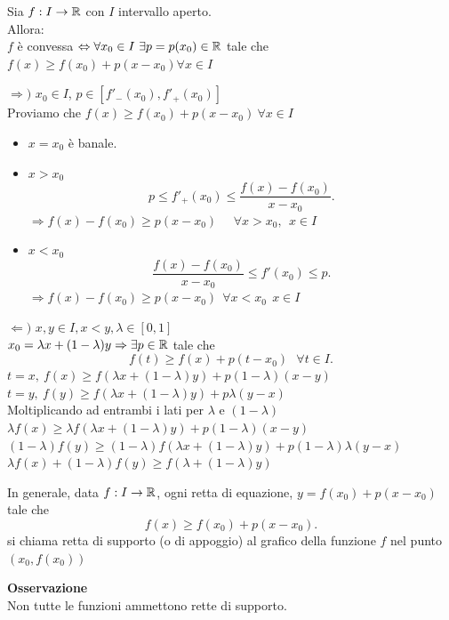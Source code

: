 \documentclass[12px]{article}
\begin{document}
	\begin{teo}
		Sia  $f:I \rightarrow \mathbb{R}$ con $I$ intervallo aperto.\\
		Allora:\\
		$f$ è convessa $ \Leftrightarrow \forall x_0\in I\ \exists p = p(x_0)\in \R$ tale che $f(x)\geq f(x_0) + p(x-x_0)\forall x\in I$
	\end{teo}
	\begin{dimo}
		$ \Rightarrow )$ $x_0\in I$, $p\in[f'_-(x_0),f'_+(x_0)]$\\
		Proviamo che $f(x) \geq f(x_0) + p(x-x_0)\ \forall x\in I$
		\begin{itemize}
			\item $x = x_0$ è banale.
			\item $x > x_0$
				\[
					p\leq f'_+(x_0) \leq\frac{f(x)-f(x_0)}{x-x_0}
				.\] 
				$ \Rightarrow  f(x) - f(x_0) \geq p(x-x_0)$ \ \ $\forall x> x_0,\ \ x\in I$
			\item $x < x_0$
				\[
					\frac{f(x)-f(x_0)}{x-x_0}\leq f'(x_0) \leq p
				.\] 
				 $\Rightarrow  f(x)-f(x_0)\geq p(x-x_0)\ \ \forall x< x_0\ \ x\in I$
		\end{itemize}
		$ \Leftarrow ) $ $x,y\in I, x < y, \lambda\in[0,1]$\\
		$x_0 = \lambda x + (1- \lambda)y \Rightarrow \exists p\in \mathbb{R}$ tale che 
		\[
		f(t)\geq f(x) + p(t-x_0) \ \ \ \forall t\in I
		.\] 
		$t = x, \ f(x)\geq f( \lambda x + (1- \lambda)y) + p (1- \lambda)(x-y)$ \\
		$t = y, \ f(y)\geq f( \lambda x + (1- \lambda)y) + p \lambda(y-x)$ \\
		Moltiplicando ad entrambi i lati per $ \lambda$ e $(1- \lambda)$
		$ \lambda f(x)\geq \lambda f( \lambda x + (1- \lambda)y) + p (1- \lambda)(x-y)$ \\
		$ (1-\lambda) f(y)\geq (1- \lambda)f( \lambda x + (1- \lambda)y) + p (1- \lambda)\lambda(y-x)$ \\
		$ \lambda f(x) + (1- \lambda)f(y) \geq f( \lambda + (1- \lambda) y)$
	\end{dimo}
	\begin{defi}
	In generale, data $f: I \rightarrow \mathbb{R}$, ogni retta di equazione, $y = f(x_0) + p(x-x_0)$  tale che
	\[
	f(x)\geq f(x_0) + p(x-x_0)
	.\] 
	si chiama retta di supporto (o di appoggio) al grafico della funzione $f$ nel punto $(x_0, f(x_0))$
	\end{defi}
	\textbf{Osservazione}\\
	Non tutte le funzioni ammettono rette di supporto.
\end{document}
